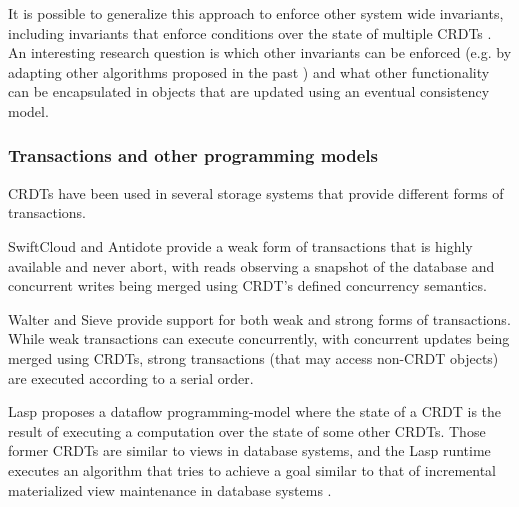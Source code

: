 \documentclass[11pt,a4paper]{article}
\begin{document}
It is possible to generalize this approach to enforce other system wide 
invariants, including invariants that enforce conditions over the state 
of multiple CRDTs \cite{Balegas15Putting}. 
An interesting research question is which other invariants can be enforced
(e.g. by adapting other algorithms proposed in the past \cite{Barbara94Demarcation,Walborn95Supporting})
and what other functionality can be encapsulated in objects that are updated
using an eventual consistency model. 


\subsubsection{Transactions and other programming models}\label{sec:appdev:adv:tx}
CRDTs have been used in several storage systems that provide different forms of 
transactions.

SwiftCloud \cite{swiftcloud} and Antidote \cite{Akkoorath16Cure}
provide a weak form of transactions that is highly available \cite{hat} and 
never abort, with reads observing a snapshot of the database and concurrent writes 
being merged using CRDT's defined concurrency semantics.   

Walter \cite{Sovran11Transactional} and Sieve \cite{Li14Automating} provide
support for both weak and strong forms of transactions. 
While weak transactions can execute concurrently, with concurrent updates 
being merged using CRDTs, strong transactions (that may access non-CRDT objects)
are executed according to a serial order.

Lasp \cite{lasp} proposes a dataflow programming-model where the state of a CRDT
is the result of executing a computation over the state of some other CRDTs. 
Those former CRDTs are similar to views in database systems, and the Lasp runtime 
executes an algorithm that tries to achieve a goal similar to that of incremental 
materialized view maintenance in database systems \cite{Gupta99Maintenance}.
\end{document}
